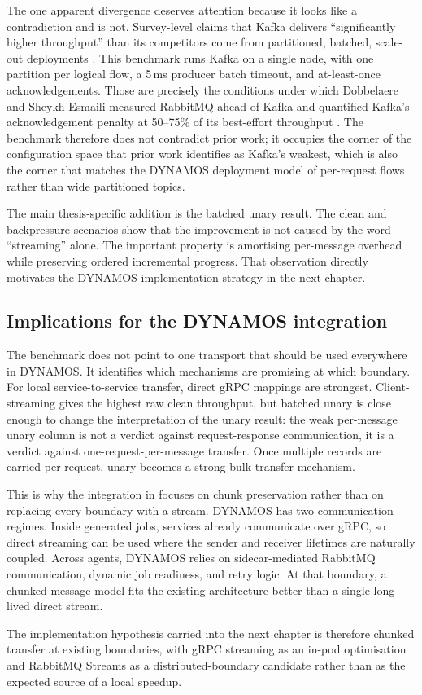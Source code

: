 The one apparent divergence deserves attention because it looks like a contradiction and is not. Survey-level claims that Kafka delivers ``significantly higher throughput'' than its competitors come from partitioned, batched, scale-out deployments \cite{sharvari2019messaging}. This benchmark runs Kafka on a single node, with one partition per logical flow, a 5\,ms producer batch timeout, and at-least-once acknowledgements. Those are precisely the conditions under which Dobbelaere and Sheykh Esmaili measured RabbitMQ ahead of Kafka and quantified Kafka's acknowledgement penalty at 50--75\% of its best-effort throughput \cite{dobbelaere2017kafkarabbitmq}. The benchmark therefore does not contradict prior work; it occupies the corner of the configuration space that prior work identifies as Kafka's weakest, which is also the corner that matches the DYNAMOS deployment model of per-request flows rather than wide partitioned topics.

The main thesis-specific addition is the batched unary result. The clean and backpressure scenarios show that the improvement is not caused by the word ``streaming'' alone. The important property is amortising per-message overhead while preserving ordered incremental progress. That observation directly motivates the DYNAMOS implementation strategy in the next chapter.

\subsection{Implications for the DYNAMOS integration}\label{sec:rq1-implications}

The benchmark does not point to one transport that should be used everywhere in DYNAMOS. It identifies which mechanisms are promising at which boundary. For local service-to-service transfer, direct gRPC mappings are strongest. Client-streaming gives the highest raw clean throughput, but batched unary is close enough to change the interpretation of the unary result: the weak per-message unary column is not a verdict against request-response communication, it is a verdict against one-request-per-message transfer. Once multiple records are carried per request, unary becomes a strong bulk-transfer mechanism.

This is why the integration in  focuses on chunk preservation rather than on replacing every boundary with a stream. DYNAMOS has two communication regimes. Inside generated jobs, services already communicate over gRPC, so direct streaming can be used where the sender and receiver lifetimes are naturally coupled. Across agents, DYNAMOS relies on sidecar-mediated RabbitMQ communication, dynamic job readiness, and retry logic. At that boundary, a chunked message model fits the existing architecture better than a single long-lived direct stream.

The implementation hypothesis carried into the next chapter is therefore chunked transfer at existing boundaries, with gRPC streaming as an in-pod optimisation and RabbitMQ Streams as a distributed-boundary candidate rather than as the expected source of a local speedup.
